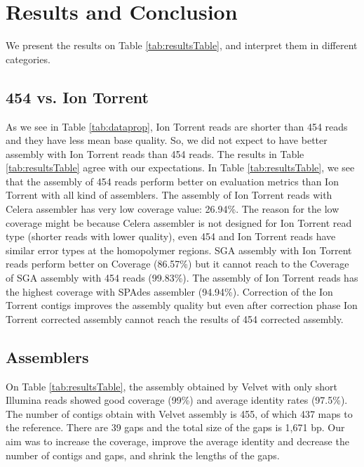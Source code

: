 \documentclass{llncs}
\begin{document}
\section{Results and Conclusion}
We present the results on Table \ref{tab:resultsTable}, and interpret them in different categories. 

\subsection{454 vs. Ion Torrent}
\label{454Ion}
As we see in Table \ref{tab:dataprop}, Ion Torrent reads are shorter than 454 reads and they have less mean base quality. So, we did not expect to have better assembly with Ion Torrent reads than 454 reads. The results in Table \ref{tab:resultsTable} agree with our expectations.
In Table \ref{tab:resultsTable}, we see that the assembly of 454 reads perform better on evaluation metrics than Ion Torrent with all kind of assemblers. The assembly of Ion Torrent reads with Celera assembler has very low coverage value: 26.94\%. The reason for the low coverage might be because Celera assembler is not designed for Ion Torrent read type (shorter reads with lower quality), even 454 and Ion Torrent reads have similar error types at the homopolymer regions. SGA assembly with Ion Torrent reads perform better on Coverage (86.57\%) but it cannot reach to the Coverage of SGA assembly with 454 reads (99.83\%). The assembly of Ion Torrent reads has the highest coverage with SPAdes assembler (94.94\%). Correction of the Ion Torrent contigs improves the assembly quality but even after correction phase Ion Torrent corrected assembly cannot reach the results of 454 corrected assembly. 

\subsection{Assemblers}

On Table \ref{tab:resultsTable}, the assembly obtained by Velvet with only short Illumina reads showed good coverage  (99\%) and average identity rates (97.5\%). The number of contigs obtain with Velvet assembly is 455, of which 437 maps to the reference. There are 39 gaps and the total size of the gaps is 1,671 bp. Our aim was to increase the coverage, improve the average identity and decrease the number of contigs and gaps, and shrink the lengths of the gaps.
\end{document}

